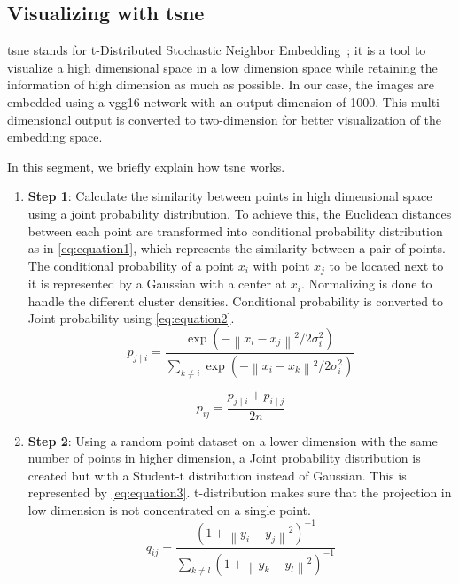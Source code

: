 \subsection{Visualizing with \gls{tsne}}\label{subsec:visualizing-with-tsne}
\gls{tsne} stands for t-Distributed Stochastic Neighbor Embedding~\cite{vanDerMaaten2008}; it is a tool to visualize a high dimensional space in a low dimension space while retaining the information of high dimension as much as possible.
In our case, the images are embedded using a \gls{vgg}16 network with an output dimension of 1000.
This multi-dimensional output is converted to two-dimension for better visualization of the embedding space.

In this segment, we briefly explain how \gls{tsne} works.

\begin{enumerate}
    \item \textbf{Step 1}: Calculate the similarity between points in high dimensional space using a joint probability distribution.
    To achieve this, the Euclidean distances between each point are transformed into conditional probability distribution as in \autoref{eq:equation1}, which represents the similarity between a pair of points.
    The conditional probability of a point $x_i$ with point $x_j$ to be located next to it is represented by a Gaussian with a center at $x_i$.
    Normalizing is done to handle the different cluster densities.
    Conditional probability is converted to Joint probability using \autoref{eq:equation2}.
    \begin{equation}
        p_{j \mid i}=\frac{\exp \left(-\left\|x_{i}-x_{j}\right\|^{2} / 2 \sigma_{i}^{2}\right)}{\sum_{k \neq i} \exp \left(-\left\|x_{i}-x_{k}\right\|^{2} / 2 \sigma_{i}^{2}\right)}
        \label{eq:equation1}
    \end{equation}

    \begin{equation}
        p_{i j}=\frac{p_{j \mid i}+p_{i \mid j}}{2 n}
        \label{eq:equation2}
    \end{equation}

    \item \textbf{Step 2}: Using a random point dataset on a lower dimension with the same number of points in higher dimension, a Joint probability distribution is created but with a Student-t distribution instead of Gaussian.
    This is represented by \autoref{eq:equation3}.
    t-distribution makes sure that the projection in low dimension is not concentrated on a single point.
    \begin{equation}
        q_{ij} = \frac{(1+\left \| y_{i}-y_{j} \right \|^{2})^{-1}}{\sum _{k\neq l} (1+\left \| y_{k}-y_{l} \right \|^{2})^{-1}}
        \label{eq:equation3}
    \end{equation}


\end{enumerate}
